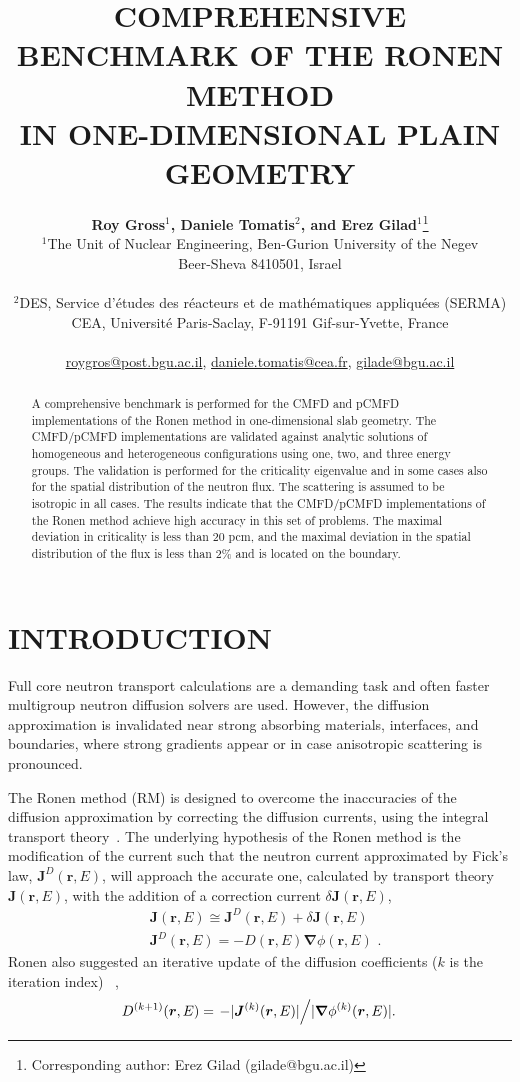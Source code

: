 \documentclass[letterpaper]{mc2021}
\title{COMPREHENSIVE BENCHMARK OF THE RONEN METHOD\\IN ONE-DIMENSIONAL PLAIN GEOMETRY}
\author{%
  \textbf{Roy Gross$^1$, Daniele Tomatis$^2$, and Erez Gilad$^1$}\footnote{Corresponding author: Erez Gilad (gilade@bgu.ac.il)} \\
  $^1$The Unit of Nuclear Engineering, Ben-Gurion University of the Negev\\ Beer-Sheva 8410501, Israel\\
\\
  $^2$DES, Service d'{\'e}tudes des r\'eacteurs et de math\'ematiques appliqu\'ees (SERMA)\\
  CEA, Universit\'e Paris-Saclay, F-91191 Gif-sur-Yvette, France\\ 
\\
  \url{roygros@post.bgu.ac.il}, \url{daniele.tomatis@cea.fr}, \url{gilade@bgu.ac.il}
}
\newcommand{\rr}{\bm{r}}
\newcommand{\rE}{\ensuremath{(\rr,E)}}
\newcommand{\bnabla}{\ensuremath{\bm{\nabla}}}
\begin{document}
\maketitle
\justify 

\begin{abstract}
  A comprehensive benchmark is performed for the CMFD and pCMFD implementations of the Ronen method in one-dimensional slab geometry. The CMFD/pCMFD implementations are validated against analytic solutions of homogeneous and heterogeneous configurations using one, two, and three energy groups. The validation is performed for the criticality eigenvalue and in some cases also for the spatial distribution of the neutron flux. The scattering is assumed to be isotropic in all cases. The results indicate that the CMFD/pCMFD implementations of the Ronen method achieve high accuracy in this set of problems. The maximal deviation in criticality is less than 20 pcm, and the maximal deviation in the spatial distribution of the flux is less than 2\% and is located on the boundary.  
\end{abstract}

\section{INTRODUCTION} 
\label{sec:intro}

Full core neutron transport calculations are a demanding task and often faster multigroup neutron diffusion solvers are used. However, the diffusion approximation is invalidated near strong absorbing materials, interfaces, and boundaries, where strong gradients appear or in case anisotropic scattering is pronounced. 

\vspace{-1.5mm}

The Ronen method (RM) is designed to overcome the inaccuracies of the diffusion approximation by correcting the diffusion currents, using the integral transport theory~\cite{Tomatis-2011,Gross-2020,Tomatis-2020}. The underlying hypothesis of the Ronen method is the modification of the current such that the neutron current approximated by Fick's law, $\bm{J}^D\rE$, will approach the accurate one, calculated by transport theory $\bm{J}\rE$, with the addition of a correction current $\delta\bm{J}\rE$,
\begin{align}
\label{eq:Fick}
& \bm{J}\rE \cong \bm{J}^D\rE + \delta\bm{J}\rE \\ 
& \bm{J}^D\rE = -D\rE\bnabla\phi\rE  \,\,.
\end{align}
Ronen also suggested an iterative update of the diffusion coefficients ($k$ is the iteration index) ~\cite{Ronen-2004},
\begin{equation}
\label{eq:RM-it}
D^{(k+1)}\rE = \left. - \lvert \bm{J}^{(k)}\rE \rvert \middle/ \lvert \bnabla \phi^{(k)}\rE \rvert. \right.
\end{equation}
\end{document}
